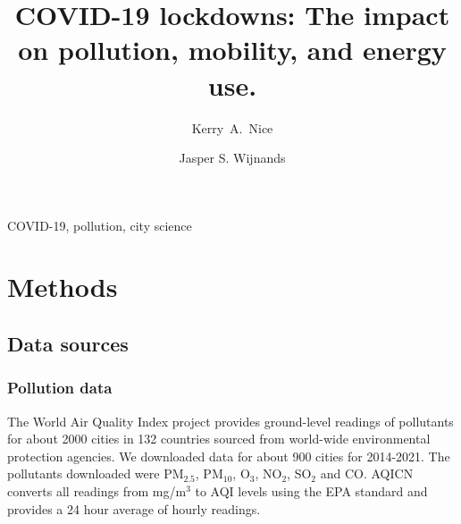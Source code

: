\documentclass[final,3p,times,authoryear]{elsarticle}
\begin{document}

\title{COVID-19 lockdowns: The impact on pollution, mobility, and energy use.}

\author[melb]{Kerry~A.~Nice}
\author[melb]{Jasper S. Wijnands}
\address[melb]{Transport, Health, and Urban Design Hub, Faculty of Architecture, Building, and Planning, University of Melbourne, Australia.}






\begin{abstract}

\end{abstract}

\begin{keyword}
COVID-19\sep 
pollution\sep
city science
\end{keyword}



\maketitle

\section{Methods}
\subsection{Data sources}

\subsubsection{Pollution data}
The World Air Quality Index project \citep{AQICN2021} provides ground-level readings of pollutants for about 2000 cities in 132 countries sourced from world-wide environmental protection agencies. We downloaded data for about 900 cities for 2014-2021. The pollutants downloaded were PM$_{2.5}$, PM$_{10}$, O$_{3}$, NO$_{2}$, SO$_{2}$ and CO. AQICN converts all readings from mg/m$^{3}$ to AQI levels using the EPA standard and provides a 24 hour average of hourly readings.
\end{document}
